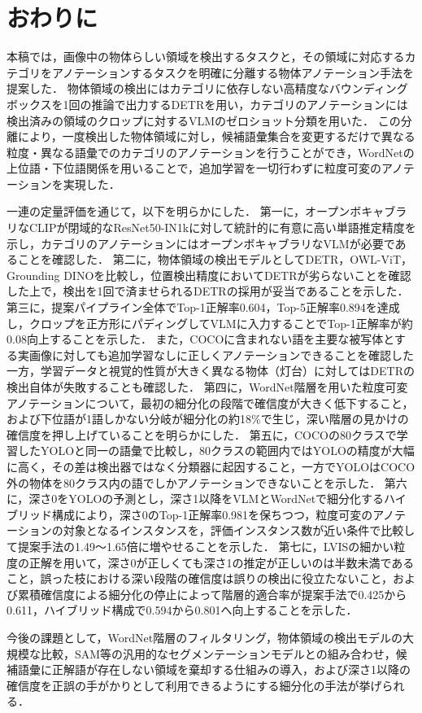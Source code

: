 \section{おわりに}
本稿では，画像中の物体らしい領域を検出するタスクと，その領域に対応するカテゴリをアノテーションするタスクを明確に分離する物体アノテーション手法を提案した．
物体領域の検出にはカテゴリに依存しない高精度なバウンディングボックスを1回の推論で出力するDETRを用い，カテゴリのアノテーションには検出済みの領域のクロップに対するVLMのゼロショット分類を用いた．
この分離により，一度検出した物体領域に対し，候補語彙集合を変更するだけで異なる粒度・異なる語彙でのカテゴリのアノテーションを行うことができ，WordNetの上位語・下位語関係を用いることで，追加学習を一切行わずに粒度可変のアノテーションを実現した．

一連の定量評価を通じて，以下を明らかにした．
第一に，オープンボキャブラリなCLIPが閉域的なResNet50-IN1kに対して統計的に有意に高い単語推定精度を示し，カテゴリのアノテーションにはオープンボキャブラリなVLMが必要であることを確認した．
第二に，物体領域の検出モデルとしてDETR，OWL-ViT，Grounding DINOを比較し，位置検出精度においてDETRが劣らないことを確認した上で，検出を1回で済ませられるDETRの採用が妥当であることを示した．
第三に，提案パイプライン全体でTop-1正解率0.604，Top-5正解率0.894を達成し，クロップを正方形にパディングしてVLMに入力することでTop-1正解率が約0.08向上することを示した．
また，COCOに含まれない語を主要な被写体とする実画像に対しても追加学習なしに正しくアノテーションできることを確認した一方，学習データと視覚的性質が大きく異なる物体（灯台）に対してはDETRの検出自体が失敗することも確認した．
第四に，WordNet階層を用いた粒度可変アノテーションについて，最初の細分化の段階で確信度が大きく低下すること，および下位語が1語しかない分岐が細分化の約18\%で生じ，深い階層の見かけの確信度を押し上げていることを明らかにした．
第五に，COCOの80クラスで学習したYOLOと同一の語彙で比較し，80クラスの範囲内ではYOLOの精度が大幅に高く，その差は検出器ではなく分類器に起因すること，一方でYOLOはCOCO外の物体を80クラス内の語でしかアノテーションできないことを示した．
第六に，深さ0をYOLOの予測とし，深さ1以降をVLMとWordNetで細分化するハイブリッド構成により，深さ0のTop-1正解率0.981を保ちつつ，粒度可変のアノテーションの対象となるインスタンスを，評価インスタンス数が近い条件で比較して提案手法の1.49〜1.65倍に増やせることを示した．
第七に，LVISの細かい粒度の正解を用いて，深さ0が正しくても深さ1の推定が正しいのは半数未満であること，誤った枝における深い段階の確信度は誤りの検出に役立たないこと，および累積確信度による細分化の停止によって階層的適合率が提案手法で0.425から0.611，ハイブリッド構成で0.594から0.801へ向上することを示した．

今後の課題として，WordNet階層のフィルタリング，物体領域の検出モデルの大規模な比較，SAM等の汎用的なセグメンテーションモデルとの組み合わせ，候補語彙に正解語が存在しない領域を棄却する仕組みの導入，および深さ1以降の確信度を正誤の手がかりとして利用できるようにする細分化の手法が挙げられる．
